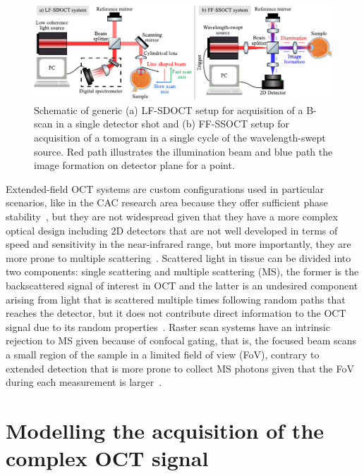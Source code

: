 \begin{figure}
    \centering
    \includegraphics[width=\textwidth]{Figures/TheoreticalBasis/LF_FFOCT_Scheme.pdf}
    \caption{Schematic of generic (a) LF-SDOCT setup for acquisition of a B-scan in a single detector shot and (b) FF-SSOCT setup for acquisition of a tomogram in a single cycle of the wavelength-swept source. Red path illustrates the illumination beam and blue path the image formation on detector plane for a point.}
    \label{fig:LF_FFOCT_Scheme}
\end{figure}

Extended-field OCT systems are custom configurations used in particular scenarios, like in the CAC research area because they offer sufficient phase stability~\cite{Kumar2013_Subaperture, Hillmann2016_Aberrationfree}, but they are not widespread given that they have a more complex optical design including 2D detectors that are not well developed in terms of speed and sensitivity in the near-infrared range, but more importantly, they are more prone to multiple scattering~\cite{Karamata2005_Multiple}. Scattered light in tissue can be divided into two components: single scattering and multiple scattering (MS), the former is the backscattered signal of interest in OCT and the latter is an undesired component arising from light that is scattered multiple times following random paths that reaches the detector, but it does not contribute direct information to the OCT signal due to its random properties~\cite{Karamata2005_Multiple-1}. Raster scan systems have an intrinsic rejection to MS given because of confocal gating, that is, the focused beam scans a small region of the sample in a limited field of view (FoV), contrary to extended detection that is more prone to collect MS photons given that the FoV during each measurement is larger~\cite{Karamata2005_Multiple}.

\section{Modelling the acquisition of the complex OCT signal}\label{Model}

